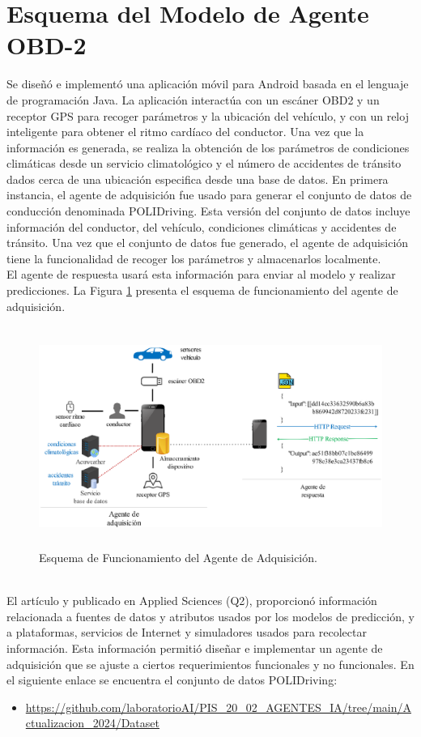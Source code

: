 \documentclass[a4paper,10pt, oneside, titlepage]{article}
\begin{document}
	\section{Esquema del Modelo de Agente OBD-2}\label{Etiqueta_Modelo_Agente_OBD-2}
	Se diseñó e implementó una aplicación móvil para Android basada en el lenguaje de programación Java. La aplicación interactúa con un escáner OBD2 y un receptor GPS para recoger parámetros y la ubicación del vehículo, y con un reloj inteligente para obtener el ritmo cardíaco del conductor. Una vez que la información es generada, se realiza la obtención de los parámetros de condiciones climáticas desde un servicio climatológico y el número de accidentes de tránsito dados cerca de una ubicación especifica desde una base de datos. En primera instancia, el agente de adquisición fue usado para generar el conjunto de datos de conducción denominada POLIDriving. Esta versión del conjunto de datos incluye información del conductor, del vehículo, condiciones climáticas y accidentes de tránsito. Una vez que el conjunto de datos fue generado, el agente de adquisición tiene la funcionalidad de recoger los parámetros y almacenarlos localmente. \\\newline
	\indent El agente de respuesta usará esta información para enviar al modelo y realizar predicciones. La Figura \ref{Esquema} presenta el esquema de funcionamiento del agente de adquisición.
	\begin{figure}[!h]
		\centering
		\includegraphics[width = 1\linewidth, height = 7.2cm]{Esquema.png}
		\caption{Esquema de Funcionamiento del Agente de Adquisición.}
		\label{Esquema}
	\end{figure} \\
	\indent El artículo \cite{marcillo2022systematic} y publicado en Applied Sciences (Q2), proporcionó información relacionada a fuentes de datos y atributos usados por los modelos de predicción, y a plataformas, servicios de Internet y simuladores usados para recolectar información. Esta información permitió diseñar e implementar un agente de adquisición que se ajuste a ciertos requerimientos funcionales y no funcionales. En el siguiente enlace se encuentra el conjunto de datos POLIDriving:
	\begin{itemize}
		\item \textcolor{blue}{\url{https://github.com/laboratorioAI/PIS_20_02_AGENTES_IA/tree/main/Actualizacion_2024/Dataset}}
	\end{itemize}
	
\end{document}
